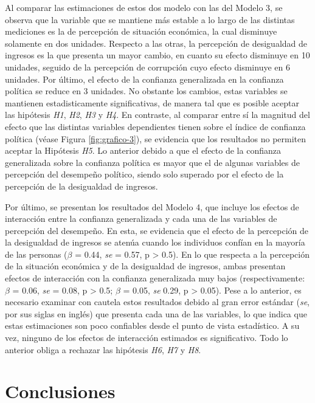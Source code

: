 \documentclass[12pt,twoside]{templates/facsothesis}
\begin{document}
Al comparar las estimaciones de estos dos modelo con las del Modelo 3, se observa que la variable que se mantiene más estable a lo largo de las distintas mediciones es la de percepción de situación económica, la cual disminuye solamente en dos unidades. Respecto a las otras, la percepción de desigualdad de ingresos es la que presenta un mayor cambio, en cuanto su efecto disminuye en 10 unidades, seguido de la percepción de corrupción cuyo efecto disminuye en 6 unidades. Por último, el efecto de la confianza generalizada en la confianza política se reduce en 3 unidades. No obstante los cambios, estas variables se mantienen estadisticamente significativas, de manera tal que es posible aceptar las hipótesis \emph{H1}, \emph{H2}, \emph{H3} y \emph{H4}. En contraste, al comparar entre sí la magnitud del efecto que las distintas variables dependientes tienen sobre el índice de confianza política (véase Figura \ref{fig:grafico-3}), se evidencia que los resultados no permiten aceptar la Hipótesis \emph{H5}. Lo anterior debido a que el efecto de la confianza generalizada sobre la confianza política es mayor que el de algunas variables de percepción del desempeño político, siendo solo superado por el efecto de la percepción de la desigualdad de ingresos.

Por último, se presentan los resultados del Modelo 4, que incluye los efectos de interacción entre la confianza generalizada y cada una de las variables de percepción del desempeño. En esta, se evidencia que el efecto de la percepción de la desigualdad de ingresos se atenúa cuando los individuos confían en la mayoría de las personas (\(\beta\) = 0.44, \emph{se} = 0.57, p \textgreater{} 0.5). En lo que respecta a la percepción de la situación económica y de la desigualdad de ingresos, ambas presentan efectos de interacción con la confianza generalizada muy bajos (respectivamente: \(\beta\) = 0.06, \emph{se} = 0.08, p \textgreater{} 0.5; \(\beta\) = 0.05, \emph{se} 0.29, p \textgreater{} 0.05). Pese a lo anterior, es necesario examinar con cautela estos resultados debido al gran error estándar (\emph{se}, por sus siglas en inglés) que presenta cada una de las variables, lo que indica que estas estimaciones son poco confiables desde el punto de vista estadístico. A su vez, ninguno de los efectos de interacción estimados es significativo. Todo lo anterior obliga a rechazar las hipótesis \emph{H6}, \emph{H7} y \emph{H8}.

\chapter{Conclusiones}\label{conclusiones}
\end{document}
